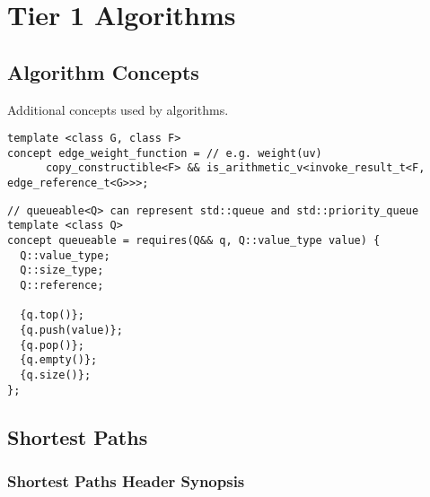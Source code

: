 \section{Tier 1 Algorithms}

\subsection{Algorithm Concepts}
Additional concepts used by algorithms.

\begin{lstlisting}
template <class G, class F>
concept edge_weight_function = // e.g. weight(uv)
      copy_constructible<F> && is_arithmetic_v<invoke_result_t<F, edge_reference_t<G>>>;
\end{lstlisting}

\begin{lstlisting}
// queueable<Q> can represent std::queue and std::priority_queue
template <class Q>
concept queueable = requires(Q&& q, Q::value_type value) {
  Q::value_type;
  Q::size_type;
  Q::reference;

  {q.top()};
  {q.push(value)};
  {q.pop()};
  {q.empty()};
  {q.size()};
};
\end{lstlisting}



\subsection{Shortest Paths}



\subsubsection{Shortest Paths Header Synopsis}



